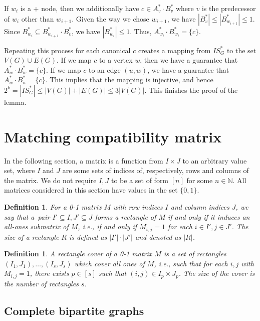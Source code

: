 \documentclass[11pt,a4paper]{article}
\newtheorem{definition}[lemma]{Definition}
\begin{document}
If $w_i$ is a + node, then we additionally have $c \in A_v^* \cdot B_v^*$ where $v$ is the predecessor of $w_i$ other than $w_{i+1}$. Given the way we chose $w_{i+1}$, we have $|B_v^*| \leq |B_{w_{i+1}}^*| \leq 1$. Since $B_{w_i}^* \subseteq B_{w_{i+1}}^* \cdot B_v^*$, we have $|B_{w_i}^*| \leq 1$. Thus, $A_{w_i}^* \cdot B_{w_i}^* = \{c\}$.

Repeating this process for each canonical $c$ creates a mapping from $IS^*_G$ to the set $V(G) \cup E(G)$. If we map $c$ to a vertex $w$, then we have a guarantee that $A_w^* \cdot B_w^* = \{c\}$. If we map $c$ to an edge $(u,w)$, we have a guarantee that $A_w^* \cdot B_u^* = \{c\}$. This implies that the mapping is injective, and hence $2^k = |IS^*_G| \leq |V(G)| + |E(G)| \leq 3|V(G)|$. This finishes the proof of the lemma.




\section{Matching compatibility matrix}
\label{sec:match}

In the following section, a matrix is a function from $I \times J$ to an arbitrary value set, where $I$ and $J$ are some sets of indices of, respectively, rows and columns of the matrix. We do not require $I, J$ to be a set of form $[n]$ for some $n \in \mathbb{N}$. All matrices considered in this section have values in the set $\{0, 1\}$.

\begin{definition}
    For a 0-1 matrix $M$ with row indices $I$ and column indices $J$, we say that a~pair $I' \subseteq I, J' \subseteq J$ forms a \emph{rectangle} of $M$ if and only if it induces an all-ones submatrix of $M$, i.e., if and only if $M_{i,j} = 1$ for each $i \in I', j \in J'$. The \emph{size} of a rectangle $R$ is defined as $|I'| \cdot |J'|$ and denoted as $|R|$.
\end{definition}

\begin{definition}
    A \emph{rectangle cover} of a 0-1 matrix $M$ is a set of rectangles $(I_1, J_1), \dots, (I_s, J_s)$ which cover all ones of $M$, i.e., such that for each $i,j$ with $M_{i,j} = 1$, there exists $p \in [s]$ such that $(i, j) \in I_p \times J_p$. The \emph{size} of the cover is the number of rectangles $s$.
\end{definition}

\subsection{Complete bipartite graphs}
\end{document}

